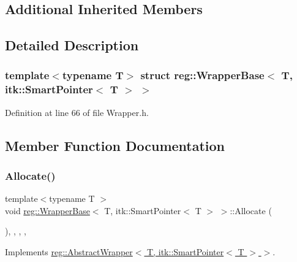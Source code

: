 \subsection*{Additional Inherited Members}


\subsection{Detailed Description}
\subsubsection*{template$<$typename T$>$\newline
struct reg\+::\+Wrapper\+Base$<$ T, itk\+::\+Smart\+Pointer$<$ T $>$ $>$}



Definition at line 66 of file Wrapper.\+h.



\subsection{Member Function Documentation}
\mbox{\label{structreg_1_1_wrapper_base_3_01_t_00_01itk_1_1_smart_pointer_3_01_t_01_4_01_4_a10fb689e5da772970c04d312d600868d}} 
\subsubsection{\texorpdfstring{Allocate()}{Allocate()}}
{\footnotesize\ttfamily template$<$typename T $>$ \\
void \hyperlink{structreg_1_1_wrapper_base}{reg\+::\+Wrapper\+Base}$<$ T, itk\+::\+Smart\+Pointer$<$ T $>$ $>$\+::Allocate (\begin{DoxyParamCaption}{ }\end{DoxyParamCaption})\hspace{0.3cm}{\ttfamily [inline]}, {\ttfamily [override]}, {\ttfamily [protected]}, {\ttfamily [virtual]}, {\ttfamily [noexcept]}}



Implements \hyperlink{structreg_1_1_abstract_wrapper_aad461ca147a0a7fcfd4f8662994742f3}{reg\+::\+Abstract\+Wrapper$<$ T, itk\+::\+Smart\+Pointer$<$ T $>$ $>$}.




